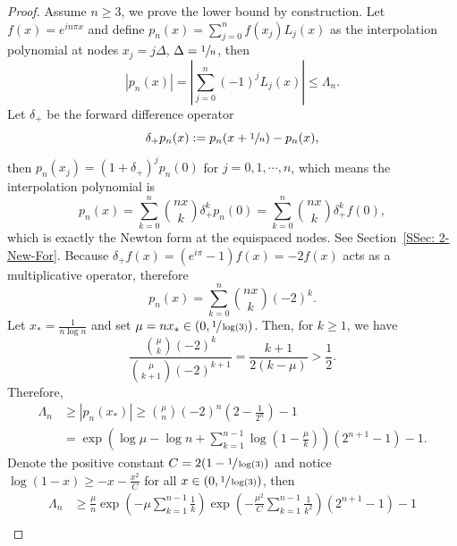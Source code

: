 \begin{proof}
    Assume $n\ge 3$, we prove the lower bound by construction. Let $f(x) = e^{i n\pi x}$ and define $p_n(x) = \sum_{j=0}^{n} f(x_j) L_j(x)$ as the interpolation polynomial at nodes $x_j = j \Delta$, $\Delta = \sfrac{1}{n}$, then $$|p_n(x)| = \left| \sum_{j=0}^{n} (-1)^j L_j(x) \right| \le \Lambda_n.$$
    Let $\delta_{+}$ be the forward difference operator
    \begin{equation}
       \delta_{+} p_n(x) := p_n(x+\sfrac{1}{n}) - p_n(x),
    \end{equation}
    then $ p_n(x_j) =  (1+\delta_{+})^j p_n(0)$ for $j=0,1,\cdots, n$, which means the interpolation polynomial is
    \begin{equation}
    \label{EQ: NEWTON-FORM-EQUI}
       p_n(x) = \sum_{k=0}^n \binom{nx}{k} \delta_+^k p_n(0) = \sum_{k=0}^n \binom{nx}{k} \delta_+^k f(0),
    \end{equation}
    which is exactly the Newton form at the equispaced nodes. See Section~\ref{SSec: 2-New-For}. Because $\delta_+ f(x) = (e^{i\pi} - 1)f(x) = -2 f(x)$ acts as a multiplicative operator, therefore 
    \begin{equation}
        p_n(x) = \sum_{k=0}^n \binom{nx}{k}  (-2)^k.
    \end{equation}
    Let $x_{\ast} = \frac{1}{n \log n}$ and set $\mu = n x_{\ast}\in(0, \sfrac{1}{\log(3)})$. Then, for $k\ge 1$, we have 
    \begin{equation}
        \frac{ \binom{\mu}{k}  (-2)^k  }{ \binom{\mu}{k + 1}  (-2)^{k + 1} } = \frac{k+1}{2(k - \mu)} > \frac{1}{2}.
    \end{equation}
    Therefore, 
    \begin{equation}
    \begin{aligned}
         \Lambda_n &\ge  |p_n(x_{\ast})| \ge \binom{\mu}{n}  (-2)^n \left(2 - \frac{1}{2^n}\right) - 1 \\
         &=\exp\left( \log\mu - \log n + \sum_{k=1}^{n-1} \log\left(1 - \frac{\mu}{k}\right) \right) (2^{n+1} - 1) - 1.
    \end{aligned}
    \end{equation}
    Denote the positive constant $C = 2(1 - \sfrac{1}{\log(3)})$ and notice $\log(1 - x) \ge -x - \frac{x^2}{C}$ for all $x\in (0, \sfrac{1}{\log(3)})$, then 
    \begin{equation}
    \begin{aligned}
        \Lambda_n &\ge \frac{\mu}{n} \exp\left(- \mu\sum_{k=1}^{n-1}\frac{1}{k}\right) \exp\left(-\frac{\mu^2}{C} \sum_{k=1}^{n-1}\frac{1}{k^2}\right)(2^{n+1} - 1) - 1 \\

\end{aligned}
\end{equation}
\end{proof}
